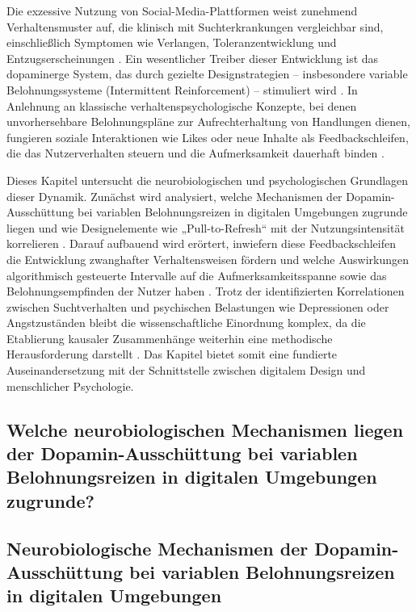 \documentclass[11pt,a4paper]{article}
\begin{document}
Die exzessive Nutzung von Social-Media-Plattformen weist zunehmend Verhaltensmuster auf, die klinisch mit Suchterkrankungen vergleichbar sind, einschließlich Symptomen wie Verlangen, Toleranzentwicklung und Entzugserscheinungen \autocite{crossref_10_51473_rcmos_v1i2_2025_1736}. Ein wesentlicher Treiber dieser Entwicklung ist das dopaminerge System, das durch gezielte Designstrategien – insbesondere variable Belohnungssysteme (Intermittent Reinforcement) – stimuliert wird \autocite{crossref_10_51473_rcmos_v1i2_2025_1736}. In Anlehnung an klassische verhaltenspsychologische Konzepte, bei denen unvorhersehbare Belohnungspläne zur Aufrechterhaltung von Handlungen dienen, fungieren soziale Interaktionen wie Likes oder neue Inhalte als Feedbackschleifen, die das Nutzerverhalten steuern und die Aufmerksamkeit dauerhaft binden \autocite{crossref_10_3758_bf03343141,crossref_10_51473_rcmos_v1i2_2025_1736}.

Dieses Kapitel untersucht die neurobiologischen und psychologischen Grundlagen dieser Dynamik. Zunächst wird analysiert, welche Mechanismen der Dopamin-Ausschüttung bei variablen Belohnungsreizen in digitalen Umgebungen zugrunde liegen und wie Designelemente wie „Pull-to-Refresh“ mit der Nutzungsintensität korrelieren \autocite{crossref_10_51473_rcmos_v1i2_2025_1736}. Darauf aufbauend wird erörtert, inwiefern diese Feedbackschleifen die Entwicklung zwanghafter Verhaltensweisen fördern und welche Auswirkungen algorithmisch gesteuerte Intervalle auf die Aufmerksamkeitsspanne sowie das Belohnungsempfinden der Nutzer haben \autocite{crossref_10_51473_rcmos_v1i2_2025_1736}. Trotz der identifizierten Korrelationen zwischen Suchtverhalten und psychischen Belastungen wie Depressionen oder Angstzuständen bleibt die wissenschaftliche Einordnung komplex, da die Etablierung kausaler Zusammenhänge weiterhin eine methodische Herausforderung darstellt \autocite{doaj_10febcbb5e60420699a1d4570a075832,openalex_W2924664363,crossref_10_3389_fpsyg_2026_1840700}. Das Kapitel bietet somit eine fundierte Auseinandersetzung mit der Schnittstelle zwischen digitalem Design und menschlicher Psychologie.

\subsection{Welche neurobiologischen Mechanismen liegen der Dopamin-Ausschüttung bei variablen Belohnungsreizen in digitalen Umgebungen zugrunde?}

\subsection{Neurobiologische Mechanismen der Dopamin-Ausschüttung bei variablen Belohnungsreizen in digitalen Umgebungen}
\end{document}
